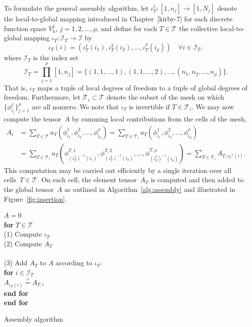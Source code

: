 To formulate the general assembly algorithm, let $\iota_T^j : [1,n_j]
\rightarrow [1,N_j]$ denote the local-to-global mapping introduced in
Chapter~[kirby-7] for each discrete function space $V^j_h$,
$j=1,2,\ldots,\rho$, and define for each $T \in \mathcal{T}$ the
collective local-to-global mapping $\iota_T : \mathcal{I}_T
\rightarrow \mathcal{I}$ by
\begin{equation}
  \iota_T(i) =
  (\iota_T^1(i_1),\iota_T^2(i_2),\ldots,\iota_T^{\rho}(i_{\rho}))
  \quad \forall i \in \mathcal{I}_T,
\end{equation}
where $\mathcal{I}_T$ is the index set
\begin{equation}
  \mathcal{I}_T =
  \prod_{j=1}^{\rho}[1,n_j] = \{(1,1,\ldots,1), (1,1,\ldots,2), \ldots,
  (n_1, n_2, \ldots, n_{\rho})\}.
\end{equation}
That is, $\iota_T$ maps a tuple of local degrees of freedom to a tuple
of global degrees of freedom. Furthermore, let $\mathcal{T}_i \subset
\mathcal{T}$ denote the subset of the mesh on which
$\{\phi_{i_j}^j\}_{j=1}^{\rho}$ are all nonzero. We note that
$\iota_T$ is invertible if $T \in \mathcal{T}_i$.
We may now compute the tensor~$A$ by summing local contributions from
the cells of the mesh,
\begin{equation}
  \begin{split}
  A_i
  &=
  \sum_{T\in\mathcal{T}}
  a_T(\phi_{i_1}^1, \phi_{i_2}^2, \ldots, \phi_{i_{\rho}}^{\rho})
  =
  \sum_{T\in\mathcal{T}_i}
  a_T(\phi_{i_1}^1, \phi_{i_2}^2, \ldots, \phi_{i_{\rho}}^{\rho}) \\
  &=
  \sum_{T\in\mathcal{T}_i}
  a_T(\phi_{(\iota_T^1)^{-1}(i_1)}^{T,1},
      \phi_{(\iota_T^2)^{-1}(i_2)}^{T,2}, \ldots,
      \phi_{(\iota_T^{\rho})^{-1}(i_{\rho})}^{T,{\rho}})
  =
  \sum_{T\in\mathcal{T}_i}
  A_{T,{\iota_T^{-1}(i)}}.
  \end{split}
\end{equation}
This computation may be carried out efficiently by a single iteration
over all cells~$T \in \mathcal{T}$. On each cell, the element
tensor~$A_T$ is computed and then added to the global tensor~$A$ as
outlined in Algorithm~\ref{alg:assembly} and illustrated in
Figure~\ref{fig:insertion}.
\begin{algorithm}
  \begin{tabbing}
    $A = 0$\\
    \textbf{for}  {$T \in \mathcal{T}$}\\
    \tab (1) Compute $\iota_T$ \\
    \tab (2) Compute $A_T$ \\ \\
    \tab (3) Add $A_T$ to $A$ according to $\iota_T$: \\
    \tab \textbf{for} $i \in \mathcal{I}_T$ \\
    \tab \tab $A_{\iota_T(i)} \stackrel{+}{=} A_{T,i}$ \\
    \tab \textbf{end for} \\
    \textbf{end for}
  \end{tabbing}
  \caption{Assembly algorithm}
  \label{alg:assembly}
\end{algorithm}

